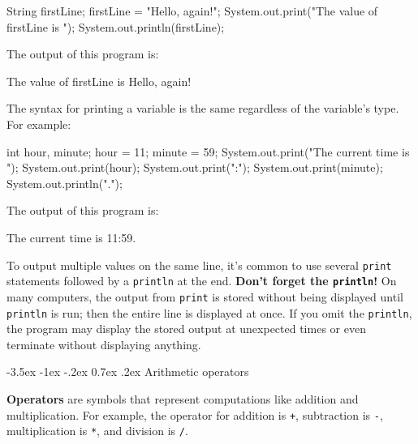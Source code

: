 \documentclass[12pt]{book}
\makeatletter
\theoremstyle{exercise}
\newcommand{\java}[1]{\verb"#1"}
\renewcommand{\section}{\@startsection{section}{1}{\z@}%
    {-3.5ex \@plus -1ex \@minus -.2ex}%
    {0.7ex \@plus.2ex}%
    {\normalfont\Large\bfseries}}
\newcommand{\java}[1]{\lstinline{#1}} %
\makeatother
\begin{document}
\begin{code}
    String firstLine;
    firstLine = "Hello, again!";
    System.out.print("The value of firstLine is ");
    System.out.println(firstLine);
\end{code}

The output of this program is:

\begin{stdout}
The value of firstLine is Hello, again!
\end{stdout}


The syntax for printing a variable is the same regardless of the variable's type.
For example:

\begin{code}
    int hour, minute;
    hour = 11;
    minute = 59;
    System.out.print("The current time is ");
    System.out.print(hour);
    System.out.print(":");
    System.out.print(minute);
    System.out.println(".");
\end{code}

The output of this program is:

\begin{stdout}
The current time is 11:59.
\end{stdout}

To output multiple values on the same line, it's common to use several \java{print} statements followed by a \java{println} at the end.
{\bf Don't forget the \java{println}!}
On many computers, the output from \java{print} is stored without being displayed until \java{println} is run; then the entire line is displayed at once.
If you omit the \java{println}, the program may display the stored output at unexpected times or even terminate without displaying anything.


\section{Arithmetic operators}
\label{sec:arithops}



{\bf Operators} are symbols that represent computations like addition and multiplication.
For example, the operator for addition is \java{+}, subtraction is \java{-}, multiplication is \java{*}, and division is \java{/}.
\end{document}
